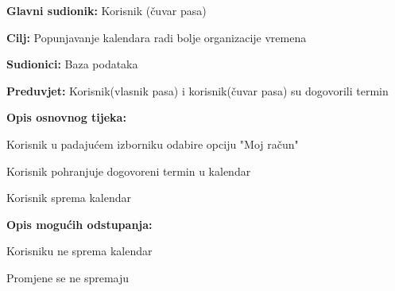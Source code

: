					\noindent {}	
					\begin{packed_item}
						
						\item \textbf{Glavni sudionik: } Korisnik (čuvar pasa)
						\item  \textbf{Cilj:} Popunjavanje kalendara radi bolje organizacije vremena
						\item  \textbf{Sudionici:} Baza podataka
						\item  \textbf{Preduvjet:} Korisnik(vlasnik pasa) i korisnik(čuvar pasa) su dogovorili termin 
						\item  \textbf{Opis osnovnog tijeka:}
						
						\item[] \begin{packed_enum}
							
							\item Korisnik u padajućem izborniku odabire opciju "Moj račun"   
							\item Korisnik pohranjuje dogovoreni termin u kalendar
							\item Korisnik sprema kalendar
							
						\end{packed_enum}
						
						\item  \textbf{Opis mogućih odstupanja:}
						
						\item[] \begin{packed_item}
							
							\item[3.a] Korisniku ne sprema kalendar
							\item[] \begin{packed_enum}
								
								\item Promjene se ne spremaju
								
							\end{packed_enum}
							
						\end{packed_item}
					\end{packed_item}	
					
